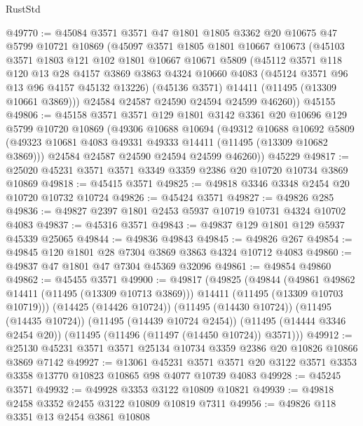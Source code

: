\begin{lexlean}{RustStd}
\begin{coremodule}
@49770 := @45084
    @3571
    @3571
    @47
    @1801
    @1805
    @3362
    @20
    @10675
    @47
    @5799
    @10721
    @10869
    (@45097
      @3571
      @1805
      @1801
      @10667
      @10673
      (@45103
        @3571
        @1803
        @121
        @102
        @1801
        @10667
        @10671
        @5809
        (@45112
          @3571
          @118
          @120
          @13
          @28
          @4157
          @3869
          @3863
          @4324
          @10660
          @4083
          (@45124 @3571 @96 @13 @96 @4157 @45132 @13226)
          (@45136 @3571)
          @14411
          (@11495 (@13309 @10661 @3869)))
        @24584
        @24587
        @24590
        @24594
        @24599
        @46260))
    @45155
@49806 := @45158
    @3571
    @3571
    @129
    @1801
    @3142
    @3361
    @20
    @10696
    @129
    @5799
    @10720
    @10869
    (@49306
      @10688
      @10694
      (@49312
        @10688
        @10692
        @5809
        (@49323 @10681 @4083 @49331 @49333 @14411 (@11495 (@13309 @10682 @3869)))
        @24584
        @24587
        @24590
        @24594
        @24599
        @46260))
    @45229
@49817 := @25020 @45231 @3571 @3571 @3349 @3359 @2386 @20 @10720 @10734 @3869 @10869
@49818 := @45415 @3571
@49825 := @49818 @3346 @3348 @2454 @20 @10720 @10732 @10724
@49826 := @45424 @3571
@49827 := @49826 @285
@49836 := @49827 @2397 @1801 @2453 @5937 @10719 @10731 @4324 @10702 @4083
@49837 := @45316 @3571
@49843 := @49837 @129 @1801 @129 @5937 @45339 @25065
@49844 := @49836 @49843
@49845 := @49826 @267
@49854 := @49845 @120 @1801 @28 @7304 @3869 @3863 @4324 @10712 @4083
@49860 := @49837 @47 @1801 @47 @7304 @45369 @32096
@49861 := @49854 @49860
@49862 := @45455 @3571
@49900 := @49817
    (@49825
      (@49844
        (@49861 @49862 @14411 (@11495 (@13309 @10713 @3869)))
        @14411
        (@11495 (@13309 @10703 @10719)))
      (@14425 (@14426 @10724))
      (@11495 (@14430 @10724))
      (@11495 (@14435 @10724))
      (@11495 (@14439 @10724 @2454))
      (@11495 (@14444 @3346 @2454 @20))
      (@11495 (@11496 (@11497 (@14450 @10724)) @3571)))
@49912 := @25130 @45231 @3571 @3571 @25134 @10734 @3359 @2386 @20 @10826 @10866 @3869 @7142
@49927 := @13061
    @45231
    @3571
    @3571
    @20
    @3122
    @3571
    @3353
    @3358
    @13770
    @10823
    @10865
    @98
    @4077
    @10739
    @4083
@49928 := @45245 @3571
@49932 := @49928 @3353 @3122 @10809 @10821
@49939 := @49818 @2458 @3352 @2455 @3122 @10809 @10819 @7311
@49956 := @49826
    @118
    @3351
    @13
    @2454
    @3861
    @10808

\end{coremodule}
\end{lexlean}
